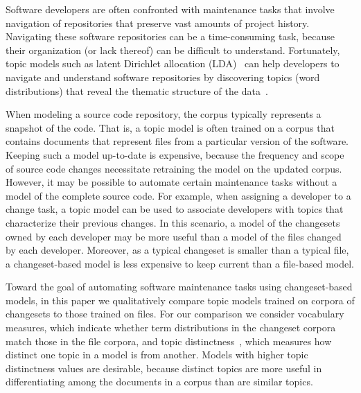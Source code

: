 Software developers are often confronted with maintenance tasks that involve navigation of repositories that preserve vast amounts of project history. Navigating these software repositories can be a time-consuming task, because their organization (or lack thereof) can be difficult to understand. Fortunately, topic models such as latent Dirichlet allocation (LDA)~\cite{Blei-etal:2003} can help developers to navigate and understand software repositories by discovering topics (word distributions) that reveal the thematic structure of the data~\cite{Linstead-etal:2007,Thomas-etal:2011,Hindle_etal:2012}.

When modeling a source code repository, the corpus typically represents a snapshot of the code. That is, a topic model is often trained on a corpus that contains documents that represent files from a particular version of the software. Keeping such a model up-to-date is expensive, because the frequency and scope of source code changes necessitate retraining the model on the updated corpus. However, it may be possible to automate certain maintenance tasks without a model of the complete source code. For example, when assigning a developer to a change task, a topic model can be used to associate developers with topics that characterize their previous changes. In this scenario, a model of the changesets owned by each developer may be more useful than a model of the files changed by each developer. Moreover, as a typical changeset is smaller than a typical file, a changeset-based model is less expensive to keep current than a file-based model.

Toward the goal of automating software maintenance tasks using changeset-based models, in this paper we qualitatively compare topic models trained on corpora of changesets to those trained on files. For our comparison we consider vocabulary measures, which indicate whether term distributions in the changeset corpora match those in the file corpora, and topic distinctness~\cite{Wei-etal:2010,Thomas-etal:2011,Chuang-etal:2012}, which measures how distinct one topic in a model is from another. Models with higher topic distinctness values are desirable, because distinct topics are more useful in differentiating among the documents in a corpus than are similar topics.



